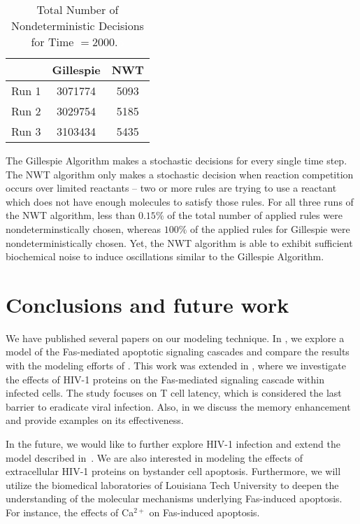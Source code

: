 \documentclass[copyright]{eptcs}
\begin{document}
{\renewcommand{\arraystretch}{1.2}\begin{table}[h!t!p!]
\caption{Total Number of Nondeterministic Decisions for Time $= 2000$.\textcolor{white}{p}} \label{nondeter}\vspace{1mm}
\centering
\begin{tabular}{|l|c|c|}
\hline
 & Gillespie & NWT\\
\hline
Run 1 & 3071774 & 5093\\
\hline
Run 2 & 3029754 & 5185\\
\hline
Run 3 & 3103434 & 5435\\
\hline
\end{tabular}
\end{table}}

The Gillespie Algorithm makes a stochastic decisions for every single time step.  The NWT algorithm only makes a stochastic decision when reaction competition occurs over limited reactants -- two or more rules are trying to use a reactant which does not have enough molecules to satisfy those rules.  For all three runs of the NWT algorithm, less than $0.15\%$ of the total number of applied rules were nondeterminstically chosen, whereas $100\%$ of the applied rules for Gillespie were nondeterministically chosen.  Yet, the NWT algorithm is able to exhibit sufficient biochemical noise to induce oscillations similar to the Gillespie Algorithm.


\section{Conclusions and future work}\label{conclusions}

We have published several papers on our modeling technique.  In \cite{jack07,jack08}, we explore a model of the Fas-mediated apoptotic signaling cascades and compare the results with the modeling efforts of \cite{hua05}.  This work was extended in \cite{jack08hiv}, where we investigate the effects of HIV-1 proteins on the Fas-mediated signaling cascade within infected cells.  The study focuses on T cell latency, which is considered the last barrier to eradicate viral infection.  Also, in \cite{jack09} we discuss the memory enhancement and provide examples on its effectiveness.

In the future, we would like to further explore HIV-1 infection and extend the model 
described in~\cite{jack08hiv}.  We are also interested in modeling the effects of 
extracellular HIV-1 proteins on bystander cell apoptosis.  Furthermore, we will utilize the biomedical laboratories of Louisiana Tech University to deepen the understanding of the molecular mechanisms underlying Fas-induced apoptosis.  For instance, the effects of Ca$^{2+}$ on Fas-induced apoptosis.
\end{document}
